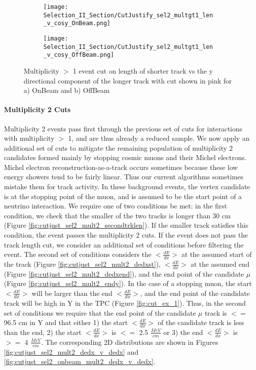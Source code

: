 \begin{figure}[H]
\centering
  \begin{subfigure}[t]{0.25\textwidth}
    \centering
\texttt{[image: Selection\_II\_Section/CutJustify\_sel2\_multgt1\_len\_v\_cosy\_OnBeam.png]}
 \caption{ }
  \end{subfigure} 
  \hspace{20mm}
  \begin{subfigure}[t]{0.25\textwidth}
    \centering
  \texttt{[image: Selection\_II\_Section/CutJustify\_sel2\_multgt1\_len\_v\_cosy\_OffBeam.png]}
   \caption{ }
  \end{subfigure} 
\caption{ Multiplicity $>$ 1 event cut on length of shorter track vs the y directional component of the longer track with cut shown in pink for a) OnBeam and b) OffBeam }
\label{fig:cutjust_sel2_onbeam_multgt1_len_v_cosy}
\end{figure}

\clearpage
\paragraph{Multiplicity 2 Cuts}
Multiplicity 2 events pass first through the previous set of cuts for interactions with multiplicity $>$ 1, and are thus already a reduced sample. We now apply an additional set of cuts to mitigate the remaining population of multiplicity 2 candidates formed mainly by stopping cosmic muons and their Michel electrons. Michel electron reconstruction-as-a-track occurs sometimes because these low energy showers tend to be fairly linear.  Thus our current algorithms sometimes mistake them for track activity.  In these background events, the vertex candidate is at the stopping point of the muon, and is assumed to be the start point of a neutrino interaction. We require one of two conditions be met: in the first condition, we check that the smaller of the two tracks is longer than 30 cm (Figure \ref{fig:cutjust_sel2_mult2_secondtrklen}). If the smaller track satisfies this condition, the event passes the multiplicity 2 cuts. If the event does not pass the track length cut, we consider an additional set of conditions before filtering the event.  The second set of conditions considers the $<\frac{dE}{dx}>$ at the assumed start of the track (Figure \ref{fig:cutjust_sel2_mult2_dedxst}), $<\frac{dE}{dx}>$ at the assumed end (Figure \ref{fig:cutjust_sel2_mult2_dedxend}), and the end point of the candidate $\mu$ (Figure \ref{fig:cutjust_sel2_mult2_endy}).  In the case of a stopping muon, the start $<\frac{dE}{dx}>$ will be larger than the end $<\frac{dE}{dx}>$, and the end point of the candidate track will be high in Y in the TPC (Figure \ref{fig:cut_ex_1}).  Thus, in the second set of conditions we require that the end point of the candidate $\mu$ track is $<=$ 96.5 cm in Y and that either 1) the start $<\frac{dE}{dx}>$ of the candidate track is less than the end, 2) the start $<\frac{dE}{dx}>$ is $<=$ 2.5 $\frac{MeV}{cm}$ or 3) the end $<\frac{dE}{dx}>$ is $>=$ 4 $\frac{MeV}{cm}$. The corresponding 2D distributions are shown in Figures \ref{fig:cutjust_sel2_mult2_dedx_v_dedx} and \ref{fig:cutjust_sel2_onbeam_mult2_dedx_v_dedx}.

